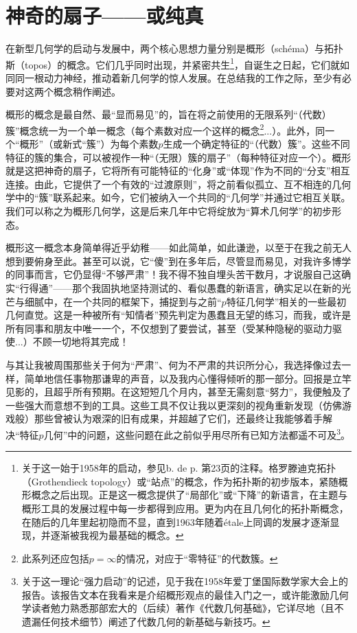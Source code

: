 
\section{神奇的扇子——或纯真}

在新型几何学的启动与发展中，两个核心思想力量分别是概形（schéma）与拓扑斯（topos）的概念。它们几乎同时出现，并紧密共生\footnote{关于这一始于1958年的启动，参见b. de p. 第23页的注释。格罗滕迪克拓扑（Grothendieck topology）或“站点”的概念，作为拓扑斯的初步版本，紧随概形概念之后出现。正是这一概念提供了“局部化”或“下降”的新语言，在主题与概形工具的发展过程中每一步都得到应用。更为内在且几何化的拓扑斯概念，在随后的几年里起初隐而不显，直到1963年随着étale上同调的发展才逐渐显现，并逐渐被我视为最基础的概念。}，自诞生之日起，它们就如同同一根动力神经，推动着新几何学的惊人发展。在总结我的工作之际，至少有必要对这两个概念稍作阐述。

概形的概念是最自然、最“显而易见”的，旨在将之前使用的无限系列“（代数）簇”概念统一为一个单一概念（每个素数对应一个这样的概念\footnote{此系列还应包括$p=\infty$的情况，对应于“零特征”的代数簇。}...）。此外，同一个“概形”（或新式“簇”）为每个素数$p$生成一个确定特征的“（代数）簇”。这些不同特征的簇的集合，可以被视作一种“（无限）簇的扇子”（每种特征对应一个）。概形就是这把神奇的扇子，它将所有可能特征的“化身”或“体现”作为不同的“分支”相互连接。由此，它提供了一个有效的“过渡原则”，将之前看似孤立、互不相连的几何学中的“簇”联系起来。如今，它们被纳入一个共同的“几何学”并通过它相互关联。我们可以称之为概形几何学，这是后来几年中它将绽放为“算术几何学”的初步形态。

概形这一概念本身简单得近乎幼稚——如此简单，如此谦逊，以至于在我之前无人想到要俯身至此。甚至可以说，它“傻”到在多年后，尽管显而易见，对我许多博学的同事而言，它仍显得“不够严肃”！我不得不独自埋头苦干数月，才说服自己这确实“行得通”——那个我固执地坚持测试的、看似愚蠢的新语言，确实足以在新的光芒与细腻中，在一个共同的框架下，捕捉到与之前“$p$特征几何学”相关的一些最初几何直觉。这是一种被所有“知情者”预先判定为愚蠢且无望的练习，而我，或许是所有同事和朋友中唯一一个，不仅想到了要尝试，甚至（受某种隐秘的驱动力驱使...）不顾一切地将其完成！

与其让我被周围那些关于何为“严肃”、何为不严肃的共识所分心，我选择像过去一样，简单地信任事物那谦卑的声音，以及我内心懂得倾听的那一部分。回报是立竿见影的，且超乎所有预期。在这短短几个月内，甚至无需刻意“努力”，我便触及了一些强大而意想不到的工具。这些工具不仅让我以更深刻的视角重新发现（仿佛游戏般）那些曾被认为艰深的旧有成果，并超越了它们，还最终让我能够着手解决“特征$p$几何”中的问题，这些问题在此之前似乎用尽所有已知方法都遥不可及\footnote{关于这一理论“强力启动”的记述，见于我在1958年爱丁堡国际数学家大会上的报告。该报告文本在我看来是介绍概形观点的最佳入门之一，或许能激励几何学读者勉力熟悉那部宏大的（后续）著作《代数几何基础》，它详尽地（且不遗漏任何技术细节）阐述了代数几何的新基础与新技巧。}。


